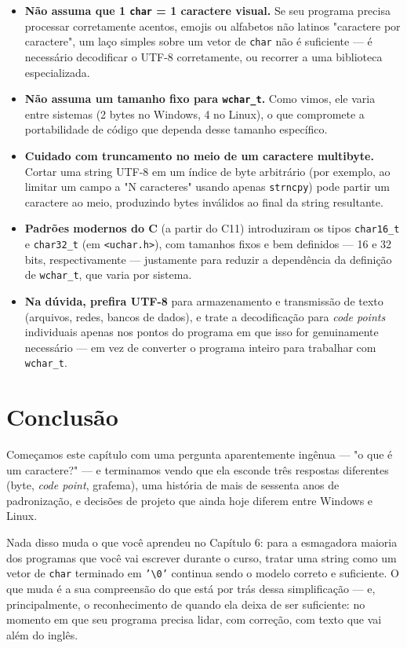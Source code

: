 \documentclass[12pt,a4paper,oneside]{extreport}
\begin{document}
\begin{itemize}
    \item \textbf{Não assuma que 1 \texttt{char} = 1 caractere visual.} Se seu programa precisa processar corretamente acentos, emojis ou alfabetos não latinos "caractere por caractere", um laço simples sobre um vetor de \texttt{char} não é suficiente — é necessário decodificar o UTF-8 corretamente, ou recorrer a uma biblioteca especializada.
    \item \textbf{Não assuma um tamanho fixo para \texttt{wchar\_t}.} Como vimos, ele varia entre sistemas (2 bytes no Windows, 4 no Linux), o que compromete a portabilidade de código que dependa desse tamanho específico.
    \item \textbf{Cuidado com truncamento no meio de um caractere multibyte.} Cortar uma string UTF-8 em um índice de byte arbitrário (por exemplo, ao limitar um campo a "N caracteres" usando apenas \texttt{strncpy}) pode partir um caractere ao meio, produzindo bytes inválidos ao final da string resultante.
    \item \textbf{Padrões modernos do C} (a partir do C11) introduziram os tipos \texttt{char16\_t} e \texttt{char32\_t} (em \texttt{<uchar.h>}), com tamanhos fixos e bem definidos — 16 e 32 bits, respectivamente — justamente para reduzir a dependência da definição de \texttt{wchar\_t}, que varia por sistema.
    \item \textbf{Na dúvida, prefira UTF-8} para armazenamento e transmissão de texto (arquivos, redes, bancos de dados), e trate a decodificação para \textit{code points} individuais apenas nos pontos do programa em que isso for genuinamente necessário — em vez de converter o programa inteiro para trabalhar com \texttt{wchar\_t}.
\end{itemize}

\section*{Conclusão}

Começamos este capítulo com uma pergunta aparentemente ingênua — "o que é um caractere?" — e terminamos vendo que ela esconde três respostas diferentes (byte, \textit{code point}, grafema), uma história de mais de sessenta anos de padronização, e decisões de projeto que ainda hoje diferem entre Windows e Linux.

Nada disso muda o que você aprendeu no Capítulo 6: para a esmagadora maioria dos programas que você vai escrever durante o curso, tratar uma string como um vetor de \texttt{char} terminado em \texttt{'\textbackslash 0'} continua sendo o modelo correto e suficiente. O que muda é a sua compreensão do que está por trás dessa simplificação — e, principalmente, o reconhecimento de quando ela deixa de ser suficiente: no momento em que seu programa precisa lidar, com correção, com texto que vai além do inglês.
\end{document}
